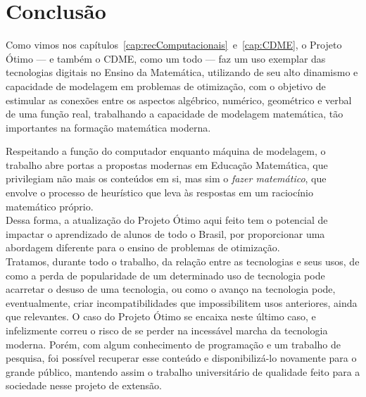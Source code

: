 \chapter{Conclusão}
\label{cap:conclusao}


Como vimos nos capítulos~\ref{cap:recComputacionais}~e~\ref{cap:CDME}, o Projeto Ótimo --- e também o CDME, como um todo --- faz um uso exemplar das tecnologias digitais no Ensino da Matemática, utilizando de seu alto dinamismo e capacidade de modelagem em problemas de otimização, com o objetivo de estimular as conexões entre os aspectos algébrico, numérico, geométrico e verbal de uma função real, trabalhando a capacidade de modelagem matemática, tão importantes na formação matemática moderna.

Respeitando a função do computador enquanto máquina de modelagem, o trabalho abre portas a propostas modernas em Educação Matemática, que privilegiam não mais os conteúdos em si, mas sim o \textit{fazer matemático}, que envolve o processo de heurístico que leva às respostas em um raciocínio matemático próprio.
\\

Dessa forma, a atualização do Projeto Ótimo aqui feito tem o potencial de impactar o aprendizado de alunos de todo o Brasil, por proporcionar uma abordagem diferente para o ensino de problemas de otimização.
\\

Tratamos, durante todo o trabalho, da relação entre as tecnologias e seus usos, de como a perda de popularidade de um determinado uso de tecnologia pode acarretar o desuso de uma tecnologia, ou como o avanço na tecnologia pode, eventualmente, criar incompatibilidades que impossibilitem usos anteriores, ainda que relevantes.
O caso do Projeto Ótimo se encaixa neste último caso, e infelizmente correu o risco de se perder na incessável marcha da tecnologia moderna. Porém, com algum conhecimento de programação e um trabalho de pesquisa, foi possível recuperar esse conteúdo e disponibilizá-lo novamente para o grande público, mantendo assim o trabalho universitário de qualidade feito para a sociedade nesse projeto de extensão.
\\

